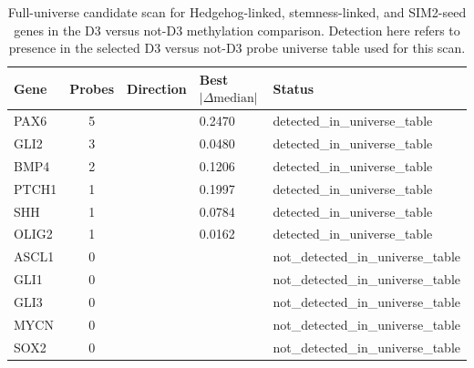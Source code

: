 \begin{table}[htbp]
\centering
\caption{Full-universe candidate scan for Hedgehog-linked, stemness-linked, and SIM2-seed genes in the D3 versus not-D3 methylation comparison. Detection here refers to presence in the selected D3 versus not-D3 probe universe table used for this scan.}
\label{tab:full_universe_candidate_scan}
\begin{tabular}{lclll}
\hline
Gene & Probes & Direction & Best $|\Delta \mathrm{median}|$ & Status \\
\hline
PAX6 & 5 &  & 0.2470 & detected\_in\_universe\_table \\
GLI2 & 3 &  & 0.0480 & detected\_in\_universe\_table \\
BMP4 & 2 &  & 0.1206 & detected\_in\_universe\_table \\
PTCH1 & 1 &  & 0.1997 & detected\_in\_universe\_table \\
SHH & 1 &  & 0.0784 & detected\_in\_universe\_table \\
OLIG2 & 1 &  & 0.0162 & detected\_in\_universe\_table \\
ASCL1 & 0 &  &  & not\_detected\_in\_universe\_table \\
GLI1 & 0 &  &  & not\_detected\_in\_universe\_table \\
GLI3 & 0 &  &  & not\_detected\_in\_universe\_table \\
MYCN & 0 &  &  & not\_detected\_in\_universe\_table \\
SOX2 & 0 &  &  & not\_detected\_in\_universe\_table \\
\hline
\end{tabular}
\end{table}
